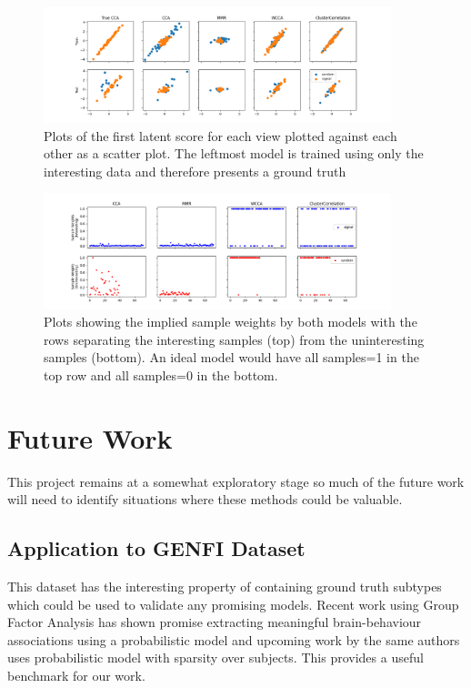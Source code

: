 \begin{figure}[H] 
    \centering
    \includegraphics[width=0.9\textwidth]{chapters/sampleselection/cca/models.png}
    \caption{Plots of the first latent score for each view plotted against each other as a scatter plot. The leftmost model is trained using only the interesting data and therefore presents a ground truth}
    \label{fig:ccalatent}
\end{figure}

\begin{figure}[H] 
    \centering
    \includegraphics[width=0.9\textwidth]{chapters/sampleselection/cca/weights.png}
    \caption{Plots showing the implied sample weights by both models with the rows separating the interesting samples (top) from the uninteresting samples (bottom). An ideal model would have all samples=1 in the top row and all samples=0 in the bottom.}
    \label{fig:ccaweights}
\end{figure}

\section{Future Work}

This project remains at a somewhat exploratory stage so much of the future work will need to identify situations where these methods could be valuable.

\subsection{Application to GENFI Dataset}

This dataset has the interesting property of containing ground truth subtypes which could be used to validate any promising models. Recent work using Group Factor Analysis \cite{Ferreira2021} has shown promise extracting meaningful brain-behaviour associations using a probabilistic model and upcoming work by the same authors uses probabilistic model with sparsity over subjects. This provides a useful benchmark for our work.

